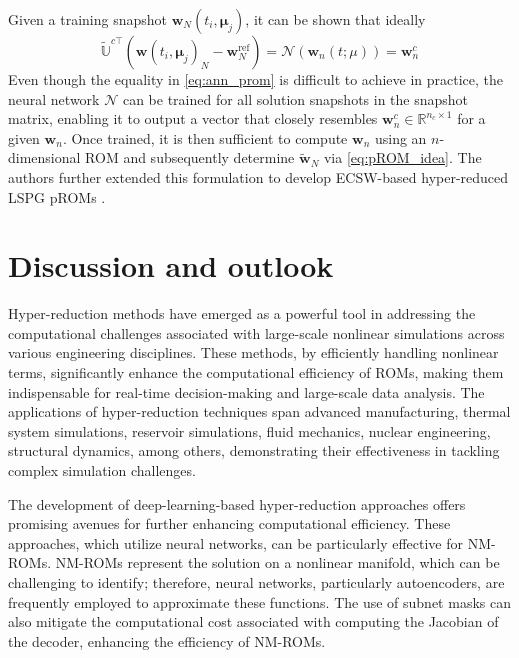 \documentclass[11pt]{article}
\renewcommand{\vec}[1]{\mathbf{#1}}
\begin{document}
Given a training snapshot \(\vec{w}_N(t_i,\boldsymbol{\mu}_j)\), it can be shown that ideally
\begin{equation}
\label{eq:ann_prom}
\widetilde{\mathbb{U}}^{c\top} (\vec{w}(t_i,\boldsymbol{\mu}_j)_N-\mathbf{w}_N^{\text{ref}}) = \mathcal{N}(\vec{w}_n(t; \mu)) = \vec{w}^c_n
\end{equation}
Even though the equality in \cref{eq:ann_prom} is difficult to achieve in practice,
the neural network \(\mathcal{N}\) can be trained for all solution snapshots in the snapshot matrix, enabling it to output a vector that closely resembles \(\vec{w}^c_n \in \mathbb{R}^{n_c \times 1}\) for a given \(\vec{w}_n\).
Once trained, it is then sufficient to compute \(\vec{w}_n\) using an \(n\)-dimensional ROM and subsequently determine \(\widetilde{\vec{w}}_N\) via \cref{eq:pROM_idea}.
The authors further extended this formulation to develop ECSW-based hyper-reduced LSPG pROMs \cite{barnett2023neural-network-augmenteda}.



\section{Discussion and outlook}
Hyper-reduction methods have emerged as a powerful tool in addressing the computational challenges associated with large-scale nonlinear simulations across various engineering disciplines.
These methods, by efficiently handling nonlinear terms, significantly enhance the computational efficiency of ROMs, making them indispensable for real-time decision-making and large-scale data analysis.
The applications of hyper-reduction techniques span advanced manufacturing, thermal system simulations, reservoir simulations, fluid mechanics, nuclear engineering, structural dynamics, among others, demonstrating their effectiveness in tackling complex simulation challenges.

The development of deep-learning-based hyper-reduction approaches offers promising avenues for further enhancing computational efficiency.
These approaches, which utilize neural networks, can be particularly effective for NM-ROMs.
NM-ROMs represent the solution on a nonlinear manifold, which can be challenging to identify; therefore, neural networks, particularly autoencoders, are frequently employed to approximate these functions.
The use of subnet masks can also mitigate the computational cost associated with computing the Jacobian of the decoder, enhancing the efficiency of NM-ROMs.
\end{document}
